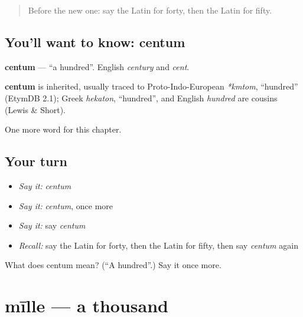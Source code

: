 \label{lesson:LA-C106-centum}



\begin{quote}
Before the new one: say the Latin for forty, then the Latin for fifty.
\end{quote}

\subsection*{You'll want to know: centum}
\textbf{centum} — \textquotedblleft{}a hundred\textquotedblright{}. English \emph{century} and \emph{cent}.

\begin{cousinweb}
\textbf{centum} is inherited, usually traced to Proto-Indo-European \emph{*kmtom}, \textquotedblleft{}hundred\textquotedblright{} (EtymDB 2.1); Greek \emph{hekaton}, \textquotedblleft{}hundred\textquotedblright{}, and English \emph{hundred} are cousins (Lewis \& Short).
\end{cousinweb}

\begin{grammarlens}[title={What you've built}]
One more word for this chapter.
\end{grammarlens}

\subsection*{Your turn}
\begin{itemize}
\raggedright
  \item \emph{Say it:} \emph{centum}
  \item \emph{Say it:} \emph{centum}, once more
  \item \emph{Say it:} say \emph{centum}
  \item \emph{Recall:} say the Latin for forty, then the Latin for fifty, then say \emph{centum} again
\end{itemize}

\begin{tcolorbox}[breakable,colback=teal!4,colframe=teal!35!black,title={Before you move on}]
What does centum mean? (\textquotedblleft{}A hundred\textquotedblright{}.) Say it once more.
\end{tcolorbox}
\section[mīlle]{mīlle — a thousand}

\label{lesson:LA-C106-mille}



